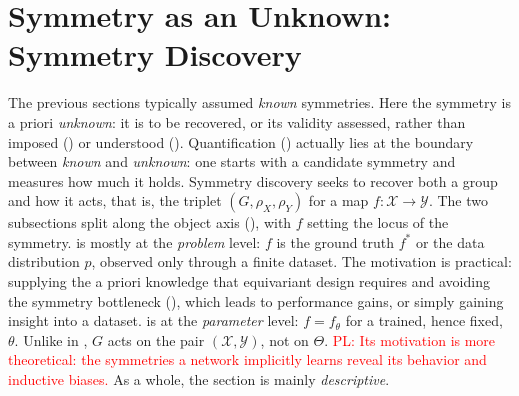 \documentclass[mathematics,review,submit,moreauthors]{Definitions/mdpi}
\newcommand{\pnote}[1]{\textcolor{red}{PL: #1}}
\begin{document}
\section{Symmetry as an Unknown: Symmetry Discovery}\label{sec:sym-disco}
The previous sections typically assumed \emph{known} symmetries.
Here the symmetry is a priori \emph{unknown}: it is to be recovered, or its validity assessed, rather than imposed () or understood ().
Quantification () actually lies at the boundary between \emph{known} and \emph{unknown}: one starts with a candidate symmetry and measures how much it holds.\newline
Symmetry discovery seeks to recover both a group and how it acts, that is, the triplet $(G,\rho_X,\rho_Y)$ for a map $f:\mathcal{X}\to \mathcal{Y}$.
The two subsections split along the object axis (), with $f$ setting the locus of the symmetry.
 is mostly at the \emph{problem} level: $f$ is the ground truth $f^*$ or the data distribution $p$, observed only through a finite dataset.
The motivation is practical: supplying the a priori knowledge that equivariant design requires and avoiding the symmetry bottleneck (), which leads to performance gains, or simply gaining insight into a dataset.
 is at the \emph{parameter} level: $f=f_\theta$ for a trained, hence fixed, $\theta$.
Unlike in , $G$ acts on the pair $(\mathcal X,\mathcal Y)$, not on $\Theta$.
\pnote{Its motivation is more theoretical: the symmetries a network implicitly learns reveal its behavior and inductive biases.}
As a whole, the section is mainly \emph{descriptive}.
\end{document}
